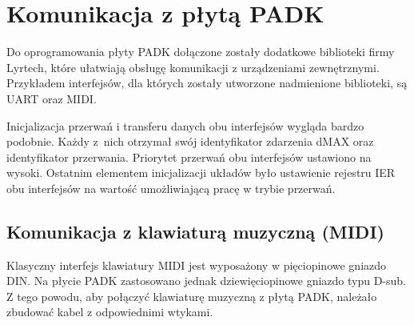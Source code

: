 \section{Komunikacja z płytą PADK}
Do oprogramowania płyty PADK dołączone zostały dodatkowe biblioteki firmy Lyrtech, które ułatwiają obsługę komunikacji z urządzeniami zewnętrznymi. Przykładem interfejsów, dla których zostały utworzone nadmienione biblioteki, są UART oraz MIDI.

Inicjalizacja przerwań i transferu danych obu interfejsów wygląda bardzo podobnie. Każdy z~nich otrzymał swój identyfikator zdarzenia dMAX oraz identyfikator przerwania. Priorytet przerwań obu interfejsów ustawiono na wysoki. Ostatnim elementem inicjalizacji układów było ustawienie rejestru IER obu interfejsów na wartość umożliwiającą pracę w trybie przerwań.

\subsection{Komunikacja z klawiaturą muzyczną  (MIDI)}
Klasyczny interfejs klawiatury MIDI jest wyposażony w pięciopinowe gniazdo DIN. Na płycie PADK zastosowano jednak dziewięciopinowe gniazdo typu D-sub. Z tego powodu, aby połączyć klawiaturę muzyczną z płytą PADK, należało zbudować kabel z odpowiednimi wtykami.

